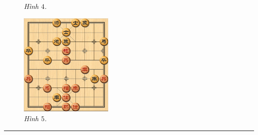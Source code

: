 \begin{multicols}{2}
\begin{figure}[H]
		\caption{\small\textit{\color{gocco}Hình $4$.}}
		\vspace*{-10pt}
	\end{figure}
	\begin{figure}[H]
		\vspace*{5pt}
		\centering
		\captionsetup{labelformat= empty, justification=centering}
		\includegraphics[width= 0.4\textwidth]{5}
		\caption{\small\textit{\color{gocco}Hình $5$.}}
		\vspace*{-10pt}
	\end{figure}
\end{multicols}
\vspace*{-10pt}
{\color{gocco}\rule{1\linewidth}{0.1pt}}

